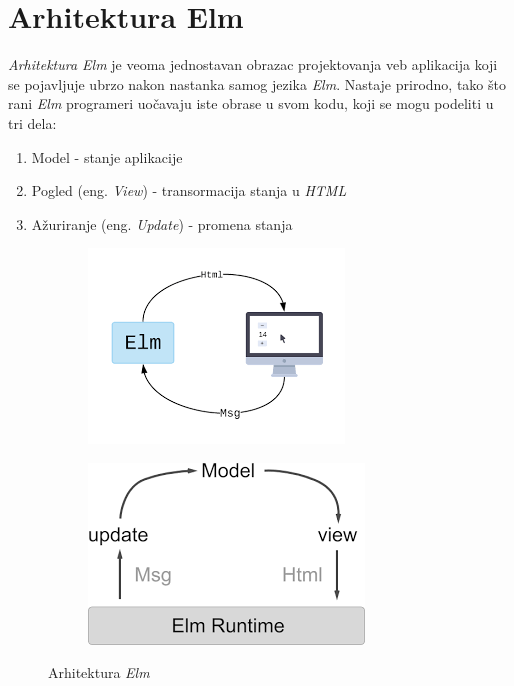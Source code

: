 \documentclass[12pt,oneside]{memoir}
\begin{document}
\section{Arhitektura Elm}
\emph{Arhitektura Elm} je veoma jednostavan obrazac projektovanja veb aplikacija koji se pojavljuje
ubrzo nakon nastanka samog jezika \emph{Elm}. Nastaje prirodno, tako što rani \emph{Elm} programeri uočavaju
iste obrase u svom kodu, koji se mogu podeliti u tri dela:
\begin{enumerate}
  \item Model - stanje aplikacije
  \item Pogled (eng. \emph{View}) - transormacija stanja u \emph{HTML}
  \item Ažuriranje (eng. \emph{Update}) - promena stanja
\end{enumerate}
\begin{figure}[!ht]
\centering
\begin{subfigure}{.5\textwidth}
  \centering
  \includegraphics[width=.8\linewidth]{elm-arch-site}
\end{subfigure}%
\begin{subfigure}{.5\textwidth}
  \centering
  \includegraphics[width=.7\linewidth]{elm-arch-book}
\end{subfigure}
\caption{Arhitektura \emph{Elm}}
\label{fig:elm-arh}
\end{figure}
\end{document}
